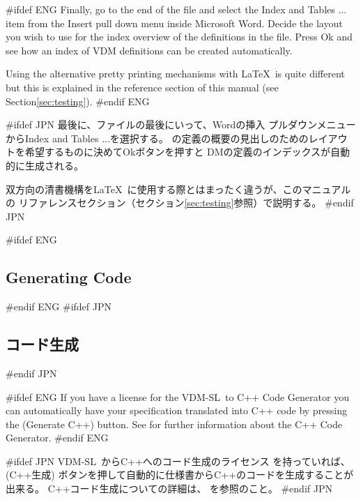 \documentclass[\pformat,12pt]{article}
\newcommand{\vdmslpp}{VDM-SL}
\newcommand{\vdmslpp}{VDM++}
\newcommand{\guicmd}[1]{{\sf #1}}
\newcommand{\guicmd}[1]{{\gt #1}}
\begin{document}
#ifdef ENG
Finally, go to the end of the file and select the \guicmd{Index
and Tables ...} item from the \guicmd{Insert} pull down menu inside
Microsoft Word. Decide the layout you wish to use for the index
overview of the definitions in the  file. Press \guicmd{Ok} and see how
an index of VDM definitions can be created automatically.

Using the alternative pretty printing mechanisms with \LaTeX\ is quite
different but this is explained in the reference section of this
manual (see Section\ref{sec:testing}).
#endif ENG

#ifdef JPN
最後に、ファイルの最後にいって、Wordの\guicmd{挿入} プルダウンメニューから\guicmd{Index
and Tables ...}を選択する。
の定義の概要の見出しのためのレイアウトを希望するものに決めて\guicmd{Ok}ボタンを押すと
DMの定義のインデックスが自動的に生成される。

双方向の清書機構を\LaTeX\ に使用する際とはまったく違うが、このマニュアルの
リファレンスセクション（セクション\ref{sec:testing}参照）で説明する。
#endif JPN

#ifdef ENG
\subsection{Generating Code}
#endif ENG
#ifdef JPN
\subsection{コード生成}
#endif JPN

#ifdef ENG
If you have a license  for the \vdmslpp\ to C++
Code Generator you can automatically have your specification
translated into C++ code by pressing the 
(\guicmd{Generate C++}) button. See
 for further
information about the C++ Code Generator.
#endif ENG

#ifdef JPN
\vdmslpp\ からC++へのコード生成のライセンス を持っていれば、 
(\guicmd{C++生成}) ボタンを押して自動的に仕様書からC++のコードを生成することが出来る。
C++コード生成についての詳細は、
を参照のこと。
#endif JPN
\end{document}
